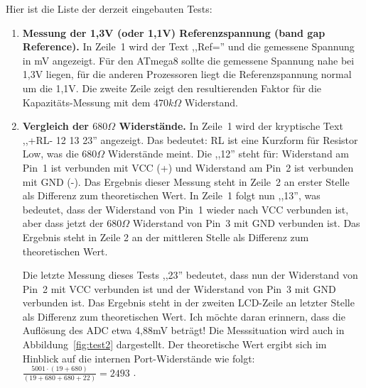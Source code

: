 \vspace{1cm}
Hier ist die Liste der derzeit eingebauten Tests:
\vspace{1cm}
\begin{enumerate}
\item {\bf Messung der 1,3V (oder 1,1V) Referenzspannung (band gap Reference).} In Zeile~1 wird der Text ,,Ref='' und die
gemessene Spannung in mV angezeigt.
Für den ATmega8 sollte die gemessene Spannung nahe bei 1,3V liegen, für die anderen Prozessoren liegt
die Referenzspannung normal um die 1,1V.
Die zweite Zeile zeigt den resultierenden Faktor für die Kapazitäts-Messung mit dem \(470k\Omega\) Widerstand.
\item {\bf Vergleich der \(680\Omega\) Widerstände.} 
In Zeile~1 wird der kryptische Text  ,,+RL- 12 13 23'' angezeigt. Das bedeutet:
RL ist eine Kurzform für Resistor Low, was die \(680\Omega\) Widerstände meint. Die ,,12'' steht für: 
Widerstand am Pin~1 ist verbunden mit VCC (+) und Widerstand am Pin~2 ist verbunden mit GND (-). 
Das Ergebnis dieser Messung steht in Zeile~2 an erster Stelle als Differenz zum theoretischen Wert.
 In Zeile~1 folgt nun ,,13'', was bedeutet, dass der Widerstand von Pin~1 wieder nach VCC verbunden ist,
aber dass jetzt der \(680\Omega\) Widerstand von Pin~3  mit GND verbunden ist.
Das Ergebnis steht in Zeile 2 an der mittleren Stelle als Differenz zum theoretischen Wert.

Die letzte Messung dieses Tests ,,23'' bedeutet, dass nun der Widerstand von Pin~2 mit VCC verbunden ist und
der Widerstand von Pin~3 mit GND verbunden ist.
Das Ergebnis steht in der zweiten LCD-Zeile an letzter Stelle als Differenz zum theoretischen Wert.
Ich möchte daran erinnern, dass die Auflösung des ADC etwa 4,88mV beträgt!
Die Messsituation wird auch in Abbildung~\ref{fig:test2} dargestellt.
Der theoretische Wert ergibt sich im Hinblick auf die internen Port-Widerstände wie folgt:
\(\frac{5001 \cdot  (19+680)}{ (19+680+680+22)} = 2493\) .


\end{enumerate}

